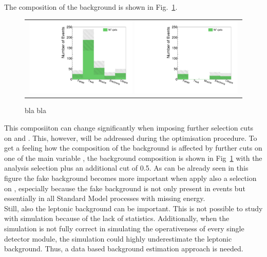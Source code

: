 The composition of the background is shown in Fig.~\ref{fig:BkgComposition}.
\begin{figure}[!tb]
  \centering 
  \begin{tabular}{c}
    \includegraphics[width=0.49\textwidth]{figures/analysis/htrackgenParticleSmallRange_lin_chiTracksfullSelectionTrigger.pdf}
    \includegraphics[width=0.49\textwidth]{figures/analysis/htrackgenParticleSmallRange_lin_chiTracksfullSelectionPlusIasTrigger.pdf}
  \end{tabular}
  \caption{bla bla}
  \label{fig:BkgComposition}
\end{figure}
This composiiton can change significantly when imposing further selection cuts on \pt and \ias.
This, however, will be addressed during the optimisation procedure.
To get a feeling how the composition of the background is affected by further cuts on one of the main variable \ias, 
the background composition is shown in Fig~\ref{fig:BkgComposition} with the analysis selection plus an additional \ias cut of 0.5.
As can be already seen in this figure the fake background becomes more important when apply also a selection on \ias, 
especially because the fake background is not only present in \WJets events but essentially in all Standard Model processes with missing energy. \\

Still, also the leptonic background can be important.
This is not possible to study with simulation because of the lack of statistics.
Additionally, when the simulation is not fully correct in simulating the operativeness of every single detector module, the simulation could highly underestimate the leptonic background.
Thus, a data based background estimation approach is needed.

